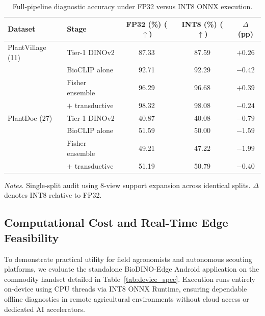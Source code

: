 \begin{table}[htbp]
\caption{Full-pipeline diagnostic accuracy under FP32 versus INT8 ONNX execution.}
\label{tab:quantization}
\centering

\footnotesize
\setlength{\tabcolsep}{4pt}
\begin{tabular*}{\columnwidth}{@{\extracolsep{\fill}}llccc}
\toprule
\textbf{Dataset} & \textbf{Stage} & \textbf{FP32 (\%) ($\uparrow$)} & \textbf{INT8 (\%) ($\uparrow$)} & \textbf{$\Delta$ (pp)} \\
\midrule
PlantVillage (11) & Tier-1 DINOv2 & 87.33 & 87.59 & $+0.26$ \\
 & BioCLIP alone & 92.71 & 92.29 & $-0.42$ \\
 & Fisher ensemble & 96.29 & 96.68 & $+0.39$ \\
 & $+$ transductive & 98.32 & 98.08 & $-0.24$ \\
\midrule
PlantDoc (27) & Tier-1 DINOv2 & 40.87 & 40.08 & $-0.79$ \\
 & BioCLIP alone & 51.59 & 50.00 & $-1.59$ \\
 & Fisher ensemble & 49.21 & 47.22 & $-1.99$ \\
 & $+$ transductive & 51.19 & 50.79 & $-0.40$ \\
\bottomrule
\end{tabular*}

\vspace{3pt}
\begin{minipage}{\columnwidth}
\footnotesize
\textit{Notes.} Single-split audit using 8-view support expansion across identical splits. $\Delta$ denotes INT8 relative to FP32.
\end{minipage}
\end{table}

\subsection{Computational Cost and Real-Time Edge Feasibility}
\label{sec:edge_hardware}

To demonstrate practical utility for field agronomists and autonomous scouting platforms, we evaluate the standalone BioDINO-Edge Android application on the commodity handset detailed in Table~\ref{tab:device_spec}. Execution runs entirely on-device using CPU threads via INT8 ONNX Runtime, ensuring dependable offline diagnostics in remote agricultural environments without cloud access or dedicated AI accelerators.

